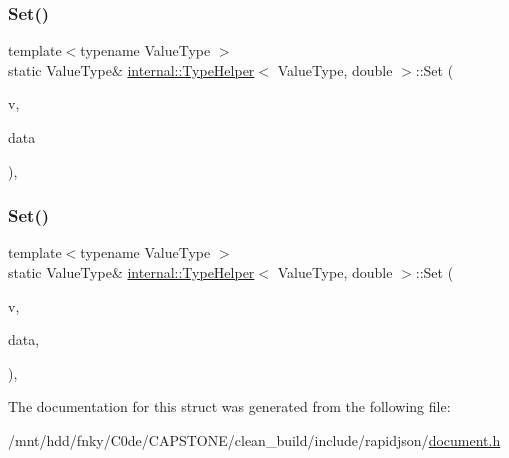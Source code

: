 \mbox{\label{structinternal_1_1TypeHelper_3_01ValueType_00_01double_01_4_a2b332dd6083278283289e107caff879b}} 
\subsubsection{\texorpdfstring{Set()}{Set()}\hspace{0.1cm}{\footnotesize\ttfamily [1/2]}}
{\footnotesize\ttfamily template$<$typename Value\+Type $>$ \\
static Value\+Type\& \hyperlink{structinternal_1_1TypeHelper}{internal\+::\+Type\+Helper}$<$ Value\+Type, double $>$\+::Set (\begin{DoxyParamCaption}\item[{Value\+Type \&}]{v,  }\item[{double}]{data }\end{DoxyParamCaption})\hspace{0.3cm}{\ttfamily [inline]}, {\ttfamily [static]}}

\mbox{\label{structinternal_1_1TypeHelper_3_01ValueType_00_01double_01_4_a69f7d942a569f3acdeb64127b2ecd9eb}} 
\subsubsection{\texorpdfstring{Set()}{Set()}\hspace{0.1cm}{\footnotesize\ttfamily [2/2]}}
{\footnotesize\ttfamily template$<$typename Value\+Type $>$ \\
static Value\+Type\& \hyperlink{structinternal_1_1TypeHelper}{internal\+::\+Type\+Helper}$<$ Value\+Type, double $>$\+::Set (\begin{DoxyParamCaption}\item[{Value\+Type \&}]{v,  }\item[{double}]{data,  }\item[{typename Value\+Type\+::\+Allocator\+Type \&}]{ }\end{DoxyParamCaption})\hspace{0.3cm}{\ttfamily [inline]}, {\ttfamily [static]}}



The documentation for this struct was generated from the following file\+:\begin{DoxyCompactItemize}
\item 
/mnt/hdd/fnky/\+C0de/\+C\+A\+P\+S\+T\+O\+N\+E/clean\+\_\+build/include/rapidjson/\hyperlink{document_8h}{document.\+h}\end{DoxyCompactItemize}
